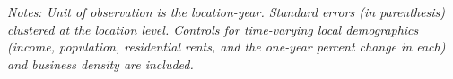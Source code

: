 \begin{table}[ht]
\begin{threeparttable}
\begin{tabular}{l*{6}{c}}
\hline\hline
\end{tabular}

\begin{tablenotes}[flushleft]
\small 
\item \textit{Notes: Unit of observation is the location-year. Standard errors (in parenthesis) clustered at the location level. Controls for time-varying local demographics (income, population, residential rents, and the one-year percent change in each) and business density are included. }
\end{tablenotes}
\end{threeparttable}
\end{table}
